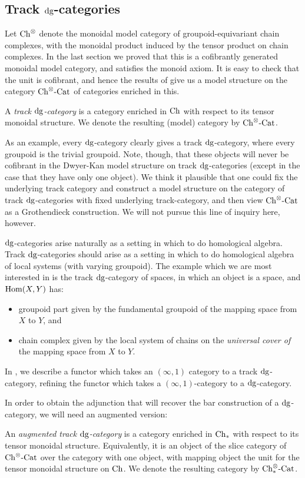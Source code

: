 \documentclass[12pt]{amsart}
\begin{document}
\subsection{Track $\mathrm{dg}$-categories}
Let ${\mathrm{Ch}}^\otimes$ denote the monoidal model category of groupoid-equivariant chain complexes, with the monoidal product induced by the tensor product on chain complexes. 
In the last section we proved that this is a cofibrantly generated monoidal model category, and satisfies the monoid axiom.
It is easy to check that the unit is cofibrant, and hence the results of \cite{Muro2012} give us a model structure on the category ${{{\mathrm{Ch}}}^{\otimes}\text{-}\mathrm{Cat}}$ of categories enriched in this. 
\begin{definition}
	A \emph{track $\mathrm{dg}$-category} is a category enriched in ${\mathrm{Ch}}$ with respect to its tensor monoidal structure. We denote the resulting (model) category by ${{{\mathrm{Ch}}}^{\otimes}\text{-}\mathrm{Cat}}$.
\end{definition}
\begin{remark}
	As an example, every $\mathrm{dg}$-category clearly gives a track $\mathrm{dg}$-category, where every groupoid is the trivial groupoid. 
Note, though, that these objects will never be cofibrant in the Dwyer-Kan model structure on track $\mathrm{dg}$-categories (except in the case that they have only one object). 
	We think it plausible that one could fix the underlying track category and construct a model structure on the category of track $\mathrm{dg}$-categories with fixed underlying track-category, and then view ${{{\mathrm{Ch}}}^{\otimes}\text{-}\mathrm{Cat}}$ as a Grothendieck construction. We will not pursue this line of inquiry here, however. 
\end{remark}
$\mathrm{dg}$-categories arise naturally as a setting in which to do homological algebra.
Track $\mathrm{dg}$-categories should arise as a setting in which to do homological algebra of local systems (with varying groupoid). 
The example which we are most interested in is the track $\mathrm{dg}$-category of spaces, in which an object is a space, and $\mathrm{Hom}(X,Y)$ has:
\begin{itemize}
	\item groupoid part given by the fundamental groupoid of the mapping space from $X$ to $Y$, and
	\item chain complex given by the local system of chains on the \textit{universal cover of} the mapping space from $X$ to $Y$. 
\end{itemize}
In \cite{Strong2025}, we describe a functor which takes an $(\infty,1)$ category to a track $\mathrm{dg}$-category,
refining the functor which takes a $(\infty,1)$-category to a $\mathrm{dg}$-category. 
\par 
In order to obtain the adjunction that will recover the bar construction of a $\mathrm{dg}$-category, we will need an augmented version:
\begin{definition}
	An \emph{augmented track $\mathrm{dg}$-category} is a category enriched in $\mathrm{Ch}_{*}$ with respect to its tensor monoidal structure. Equivalently, it is an object of the slice category of ${{{\mathrm{Ch}}}^{\otimes}\text{-}\mathrm{Cat}}$ over the category with one object, with mapping object the unit for the tensor monoidal structure on ${\mathrm{Ch}}$. 
	We denote the resulting category by ${\mathrm{Ch}_{*}^{\otimes}\text{-}\mathrm{Cat}}$. 
\end{definition}
\end{document}
